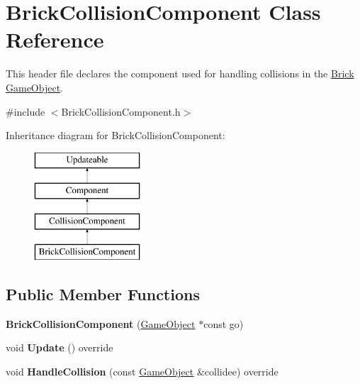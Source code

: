\hypertarget{class_brick_collision_component}{}\section{Brick\+Collision\+Component Class Reference}
\label{class_brick_collision_component}


This header file declares the component used for handling collisions in the \hyperlink{class_brick}{Brick} \hyperlink{class_game_object}{Game\+Object}.  




{\ttfamily \#include $<$Brick\+Collision\+Component.\+h$>$}

Inheritance diagram for Brick\+Collision\+Component\+:\begin{figure}[H]
\begin{center}
\leavevmode
\includegraphics[height=4.000000cm]{class_brick_collision_component}
\end{center}
\end{figure}
\subsection*{Public Member Functions}
\begin{DoxyCompactItemize}
\item 
\hypertarget{class_brick_collision_component_ac2c7dfafc9fea0857d018e52879a9847}{}{\bfseries Brick\+Collision\+Component} (\hyperlink{class_game_object}{Game\+Object} $\ast$const go)\label{class_brick_collision_component_ac2c7dfafc9fea0857d018e52879a9847}

\item 
\hypertarget{class_brick_collision_component_a944b2ff38843cda6bd387a198470552c}{}void {\bfseries Update} () override\label{class_brick_collision_component_a944b2ff38843cda6bd387a198470552c}

\item 
\hypertarget{class_brick_collision_component_a601bd53d0b9e8383e6a5e47d549587ab}{}void {\bfseries Handle\+Collision} (const \hyperlink{class_game_object}{Game\+Object} \&collidee) override\label{class_brick_collision_component_a601bd53d0b9e8383e6a5e47d549587ab}

\end{DoxyCompactItemize}
